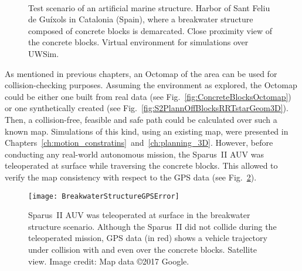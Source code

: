 \begin{figure}[htbp]
\myfloatalign
     \\%
     \quad
\caption[Test scenario of an artificial marine structure.]
{Test scenario of an artificial marine structure. 
\protect {} Harbor of Sant Feliu de Gu\'ixols in
Catalonia (Spain), where a breakwater structure composed of concrete blocks is
demarcated.
\protect {} Close proximity view of the
concrete blocks. \protect {} Virtual
environment for simulations over \ac{UWSim}.}
\label{fig:BreakwaterStructure}
\end{figure}

As mentioned in previous chapters, an Octomap of the area can be used for
collision-checking purposes. Assuming the environment as explored, the Octomap
could be either one built from real data (see
Fig.~\ref{fig:ConcreteBlocksOctomap}) or one synthetically created (see
Fig.~\ref{fig:S2PlannOffBlocksRRTstarGeom3D}). Then, a collision-free, feasible
and safe path could be calculated over such a known map. Simulations of
this kind, \ie using an existing map, were presented in
Chapters~\ref{ch:motion_constratins}~and~\ref{ch:planning_3D}. However, before
conducting any real-world autonomous mission, the Sparus~II \ac{AUV} was
teleoperated at surface while traversing the concrete blocks. This allowed to
verify the map consistency with respect to the GPS data (see
Fig.~\ref{fig:S2TeleopConcrBlocks}).

\begin{figure}[htbp]
\myfloatalign
    \label{fig:BreakwaterStructureGPSError}
     \texttt{[image: BreakwaterStructureGPSError]}
\caption[Sparus~II AUV is teleoperated at surface in the breakwater structure
scenario.] 
{Sparus~II AUV was teleoperated at surface in the breakwater structure scenario.
Although the Sparus~II did not collide
during the teleoperated mission, GPS data (in red) shows a vehicle trajectory
under collision with and even over the concrete blocks. Satellite view. Image
credit: Map data \copyright 2017 Google.}
\label{fig:S2TeleopConcrBlocks}
\end{figure}

